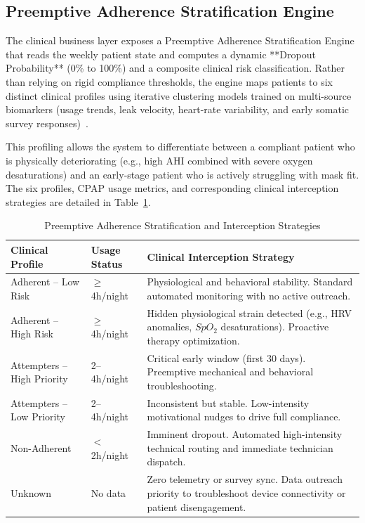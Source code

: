 \documentclass[conference]{IEEEtran}
\begin{document}
\subsection{Preemptive Adherence Stratification Engine}

The clinical business layer exposes a Preemptive Adherence Stratification Engine that reads the weekly patient state and computes a dynamic **Dropout Probability** (0\% to 100\%) and a composite clinical risk classification. Rather than relying on rigid compliance thresholds, the engine maps patients to six distinct clinical profiles using iterative clustering models trained on multi-source biomarkers (usage trends, leak velocity, heart-rate variability, and early somatic survey responses)~\cite{kakaei2025skima,kakaei2025cbms}. 

This profiling allows the system to differentiate between a compliant patient who is physically deteriorating (e.g., high AHI combined with severe oxygen desaturations) and an early-stage patient who is actively struggling with mask fit. The six profiles, CPAP usage metrics, and corresponding clinical interception strategies are detailed in Table~\ref{tab:profiles}.

\begin{table}[htbp]
\caption{Preemptive Adherence Stratification and Interception Strategies}
\label{tab:profiles}
\begin{center}
\begin{tabular}{p{1.7cm}p{1.3cm}p{4.2cm}}
\toprule
\textbf{Clinical Profile} & \textbf{Usage Status} & \textbf{Clinical Interception Strategy} \\
\midrule
Adherent -- Low Risk
  & $\geq$4h/night
  & Physiological and behavioral stability. Standard automated monitoring with no active outreach. \\
\addlinespace
Adherent -- High Risk
  & $\geq$4h/night
  & Hidden physiological strain detected (e.g., HRV anomalies, $SpO_2$ desaturations). Proactive therapy optimization. \\
\addlinespace
Attempters -- High Priority
  & 2--4h/night
  & Critical early window (first 30 days). Preemptive mechanical and behavioral troubleshooting. \\
\addlinespace
Attempters -- Low Priority
  & 2--4h/night
  & Inconsistent but stable. Low-intensity motivational nudges to drive full compliance. \\
\addlinespace
Non-Adherent
  & $<$2h/night
  & Imminent dropout. Automated high-intensity technical routing and immediate technician dispatch. \\
\addlinespace
Unknown
  & No data
  & Zero telemetry or survey sync. Data outreach priority to troubleshoot device connectivity or patient disengagement. \\
\bottomrule
\end{tabular}
\end{center}
\end{table}
\end{document}
